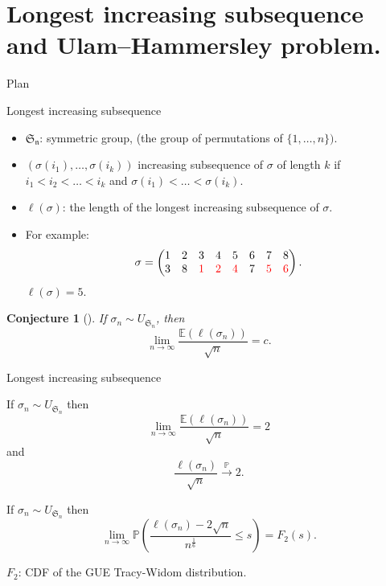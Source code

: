 \documentclass[english,xcolor=table]{beamer}
\newtheorem{conjecture}[theorem]{Conjecture}
\begin{document}
\section{Longest increasing subsequence and Ulam–Hammersley problem.}
\begin{frame}{Plan}
\tableofcontents[currentsection,currentsubsection,
    hideothersubsections, 
    sectionstyle=show/shaded,
]
\end{frame}

\begin{frame}{Longest increasing subsequence}
\begin{itemize}

\item $\mathfrak{S_n}$: symmetric group, (the  group of permutations of $\{1,\dots,n\}).$
\\ 
\item $(\sigma(i_1),\dots,\sigma(i_k))$  increasing  subsequence of $\sigma$ of length $k$ if $i_1<i_2<\dots<i_k$ and $\sigma(i_1)<\dots<\sigma(i_k)$.
\item $\ell(\sigma)$: the length of the longest increasing subsequence of $\sigma$.
\item For example: $$\sigma = \begin{pmatrix} 
1 & 2 & 3 & 4 & 5 & 6 & 7 & 8 \\
3 & 8 & \color{red} 1 &\color{red} 2 &\color{red} 4 & 7 &\color{red} 5 &\color{red} 6
  \end{pmatrix}.$$
$\ell(\sigma)=5$.
\end{itemize}
    \begin{conjecture}[\cite{ulam}]
    If $\sigma_n \sim {U}_{\mathfrak{S}_n}$, then
    $$\lim_{n\to \infty}\frac{\mathbb{E}(\ell(\sigma_n))}{\sqrt{n}}=c.$$ 
    \end{conjecture}
\end{frame}

\begin{frame}{Longest increasing subsequence}
\begin{theorem}
  If $\sigma_n \sim {U}_{\mathfrak{S}_n}$ then
    $$\lim_{n\to \infty}\frac{\mathbb{E}(\ell(\sigma_n))}{\sqrt{n}}=2$$
    and
    $$ \frac{\ell(\sigma_n)}{\sqrt{n}} \overset{\mathbb{P}}\to 2.$$ 
\end{theorem}
\begin{theorem}  \label{dbj}
 If $\sigma_n \sim {U}_{\mathfrak{S}_n}$ then
\begin{equation*} 
\lim_{n \to \infty} \mathbb{P}\left(\frac{\ell(\sigma_n)-2\sqrt{n}}{n^\frac 16}\leq s\right)=F_2(s).
\end{equation*}
\end{theorem}
    $F_2$: CDF of the GUE Tracy-Widom distribution. 
\end{frame}
\end{document}
